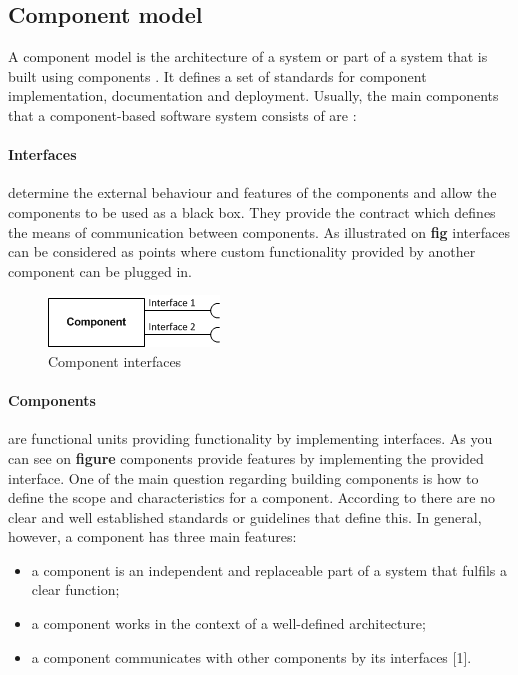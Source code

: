 \subsection{Component model}

A component model is the architecture of a system or part of a system that is built using components \cite{Cai}. It defines a set of  standards for component implementation, documentation and deployment. Usually, the main components that a component-based software system consists of are \cite{Chen}:

\paragraph{Interfaces}
	determine the external behaviour and features of the components and allow the components to be used as a black box. They provide the contract which defines the means of communication between components. As illustrated on \textbf{fig} interfaces can be considered as points where custom functionality provided by another component can be plugged in. 
	
	\begin{figure}[h!]
  		\centering
  		\includegraphics[scale=0.75]{plug-in/component-interfaces.png}
  		\caption{Component interfaces }
	\end{figure}

\paragraph{Components}
	are functional units providing functionality by implementing interfaces. As you can see on \textbf{figure} components provide  features by implementing the provided interface. One of the main question regarding building components is how to define the scope and characteristics for a component. According to \cite{Cai} there are no clear and well established standards or guidelines that define this. In general, however, a component has three main features: 

\begin{itemize}
	\item a component is an independent and replaceable part of a system that fulfils a clear function; 
	\item a component works in the context of a well-defined architecture;
	\item a component communicates with other components by its interfaces [1].
\end{itemize}

